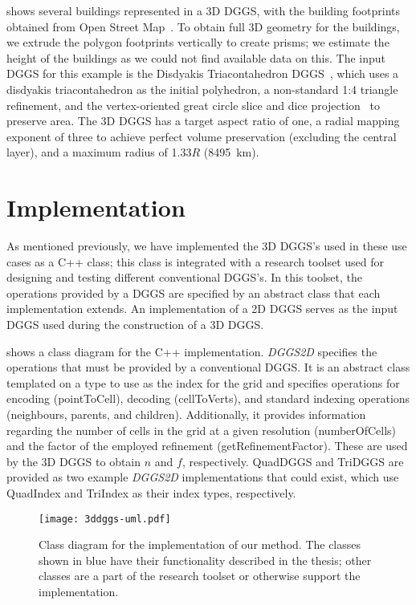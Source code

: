  shows several buildings represented in a 3D DGGS, with the building footprints obtained from Open Street Map~\cite{osm}.
To obtain full 3D geometry for the buildings, we extrude the polygon footprints vertically to create prisms; we estimate the height of the buildings as we could not find available data on this.
The input DGGS for this example is the Disdyakis Triacontahedron DGGS~\cite{hall2020disdyakis}, which uses a disdyakis triacontahedron as the initial polyhedron, a non-standard 1:4 triangle refinement, and the vertex-oriented great circle slice and dice projection~\cite{van2006slice} to preserve area.
The 3D DGGS has a target aspect ratio of one, a radial mapping exponent of three to achieve perfect volume preservation (excluding the central layer), and a maximum radius of 1.33$R$ (8495~km).


\section{Implementation} \label{chap:8:impl}
As mentioned previously, we have implemented the 3D DGGS's used in these use cases as a C++ class; this class is integrated with a research toolset used for designing and testing different conventional DGGS's.
In this toolset, the operations provided by a DGGS are specified by an abstract class that each implementation extends.
An implementation of a 2D DGGS serves as the input DGGS used during the construction of a 3D DGGS.


 shows a class diagram for the C++ implementation.
\textit{DGGS2D} specifies the operations that must be provided by a conventional DGGS.
It is an abstract class templated on a type to use as the index for the grid and specifies operations for encoding (pointToCell), decoding (cellToVerts), and standard indexing operations (neighbours, parents, and children).
Additionally, it provides information regarding the number of cells in the grid at a given resolution (numberOfCells) and the factor of the employed refinement (getRefinementFactor).
These are used by the 3D DGGS to obtain $n$ and $f$, respectively. QuadDGGS and TriDGGS are provided as two example \textit{DGGS2D} implementations that could exist, which use QuadIndex and TriIndex as their index types, respectively.


\begin{figure}[ht!]
	\centering
	\texttt{[image: 3ddggs-uml.pdf]}
	\caption[Class diagram of the grid extension implementation]{
		Class diagram for the implementation of our method. The classes shown in blue have their functionality described in the thesis; other classes are a part of the research toolset or otherwise support the implementation.
	}
	\label{fig:uml}
\end{figure}


